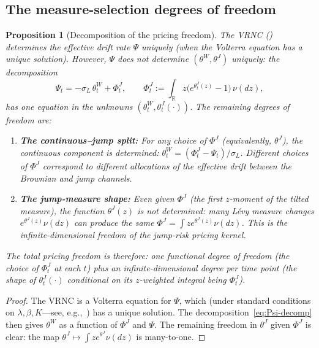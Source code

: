 \documentclass[11pt,a4paper]{article}
\theoremstyle{plain}
\newtheorem{proposition}[theorem]{Proposition}
\theoremstyle{definition}
\theoremstyle{remark}
\newcommand{\R}{\mathbb{R}}
\begin{document}
\subsection{The measure-selection degrees of freedom}

\begin{proposition}[Decomposition of the pricing freedom]
\label{prop:freedom}
The VRNC () determines the effective drift
rate $\Psi$ uniquely (when the Volterra equation has a unique
solution).  However, $\Psi$ does not determine $(\theta^W,
\theta^J)$ uniquely: the decomposition
\begin{equation}\label{eq:Psi-decomp}
  \Psi_t = -\sigma_L\,\theta_t^W + \Phi_t^J,
  \qquad
  \Phi_t^J := \int_\R z\bigl(e^{\theta_t^J(z)} - 1\bigr)\,\nu(dz),
\end{equation}
has one equation in the unknowns $(\theta_t^W, \theta_t^J(\cdot))$.
The remaining degrees of freedom are:
\begin{enumerate}[label=(\alph*)]
\item \textbf{The continuous--jump split:} For any choice of
  $\Phi^J$ (equivalently, $\theta^J$), the continuous component is
  determined: $\theta_t^W = (\Phi_t^J - \Psi_t)/\sigma_L$.
  Different choices of $\Phi^J$ correspond to different
  allocations of the effective drift between the Brownian and
  jump channels.

\item \textbf{The jump-measure shape:} Even given $\Phi^J$
  (the first $z$-moment of the tilted measure), the function
  $\theta^J(z)$ is not determined: many L\'evy measure
  changes $e^{\theta^J(z)}\nu(dz)$ can produce the same
  $\Phi^J = \int ze^{\theta^J(z)}\nu(dz)$.  This is the
  infinite-dimensional freedom of the jump-risk pricing
  kernel.
\end{enumerate}
The total pricing freedom is therefore: one functional
degree of freedom (the choice of $\Phi^J_t$ at each $t$)
plus an infinite-dimensional degree per time point (the
shape of $\theta^J_t(\cdot)$ conditional on its
$z$-weighted integral being $\Phi_t^J$).
\end{proposition}

\begin{proof}
The VRNC is a Volterra equation for $\Psi$, which (under
standard conditions on $\lambda, \beta, K$---see,
e.g.,~\cite{GripenbergLondenStaffans1990}) has a unique
solution.  The decomposition~\eqref{eq:Psi-decomp} then
gives $\theta^W$ as a function of $\Phi^J$ and $\Psi$.
The remaining freedom in $\theta^J$ given $\Phi^J$ is
clear: the map $\theta^J \mapsto \int ze^{\theta^J}\nu(dz)$
is many-to-one.
\end{proof}
\end{document}
